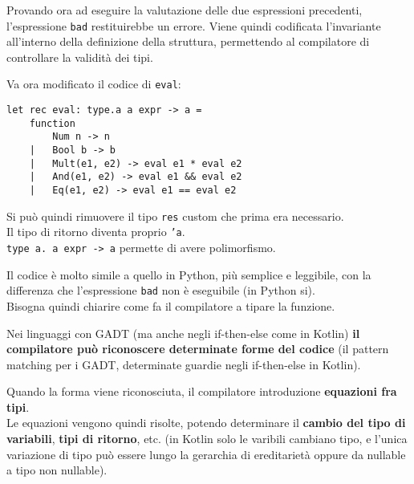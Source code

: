 \documentclass{article}
\begin{document}
Provando ora ad eseguire la valutazione delle due espressioni precedenti, l'espressione \texttt{bad} restituirebbe un errore. Viene quindi codificata l'invariante all'interno della definizione della struttura, permettendo al compilatore di controllare la validità dei tipi.

Va ora modificato il codice di \texttt{eval}:
\begin{tcolorbox}
\begin{verbatim}
let rec eval: type.a a expr -> a =
    function
        Num n -> n
    |   Bool b -> b
    |   Mult(e1, e2) -> eval e1 * eval e2
    |   And(e1, e2) -> eval e1 && eval e2
    |   Eq(e1, e2) -> eval e1 == eval e2
\end{verbatim}
\end{tcolorbox}
Si può quindi rimuovere il tipo \texttt{res} custom che prima era necessario.\\
Il tipo di ritorno diventa proprio \texttt{'a}.\\
\texttt{type a. a expr -> a} permette di avere polimorfismo.

Il codice è molto simile a quello in Python, più semplice e leggibile, con la differenza che l'espressione \texttt{bad} non è eseguibile (in Python si).\vspace{14pt}\\
Bisogna quindi chiarire come fa il compilatore a tipare la funzione.

Nei linguaggi con GADT (ma anche negli if-then-else come in Kotlin) \textbf{il compilatore può riconoscere determinate forme del codice} (il pattern matching per i GADT, determinate guardie negli if-then-else in Kotlin).

Quando la forma viene riconosciuta, il compilatore introduzione \textbf{equazioni fra tipi}.\\
Le equazioni vengono quindi risolte, potendo determinare il \textbf{cambio del tipo di variabili}, \textbf{tipi di ritorno}, etc. (in Kotlin solo le varibili cambiano tipo, e l'unica variazione di tipo può essere lungo la gerarchia di ereditarietà oppure da nullable a tipo non nullable).
\end{document}

